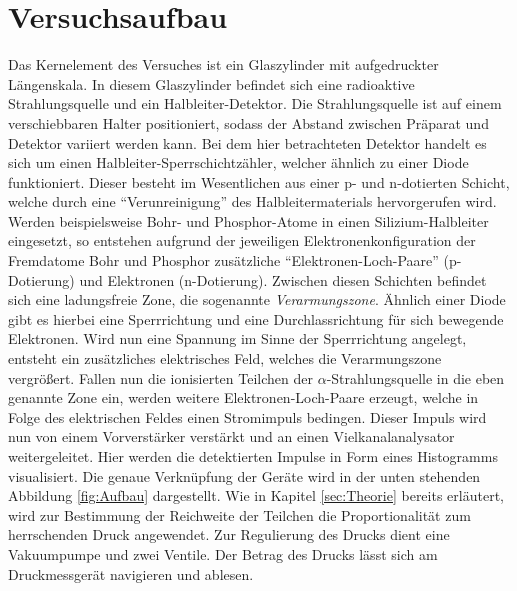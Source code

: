 


\section{Versuchsaufbau}
\label{sec:Versuchsaufbau}

Das Kernelement des Versuches ist ein Glaszylinder mit aufgedruckter Längenskala. In diesem Glaszylinder befindet 
sich eine radioaktive Strahlungsquelle und ein Halbleiter-Detektor. Die Strahlungsquelle ist auf einem verschiebbaren Halter 
positioniert, sodass der Abstand zwischen Präparat und Detektor variiert werden kann. Bei dem hier betrachteten Detektor 
handelt es sich um einen Halbleiter-Sperrschichtzähler, welcher ähnlich zu einer Diode funktioniert. Dieser besteht im 
Wesentlichen aus einer p- und n-dotierten Schicht, welche durch eine \enquote{Verunreinigung} des Halbleitermaterials 
hervorgerufen wird. Werden beispielsweise Bohr- und Phosphor-Atome in einen Silizium-Halbleiter eingesetzt, so entstehen aufgrund 
der jeweiligen Elektronenkonfiguration der Fremdatome Bohr und Phosphor zusätzliche \enquote{Elektronen-Loch-Paare} (p-Dotierung)
und Elektronen (n-Dotierung). Zwischen diesen Schichten befindet sich eine ladungsfreie Zone, die sogenannte 
\emph{Verarmungszone}. Ähnlich einer Diode gibt es hierbei eine Sperrrichtung und eine Durchlassrichtung für sich bewegende Elektronen.
Wird nun eine Spannung im Sinne der Sperrrichtung angelegt, entsteht ein zusätzliches elektrisches Feld, welches die Verarmungszone 
vergrößert. Fallen nun die ionisierten Teilchen der $\alpha$-Strahlungsquelle in die eben genannte Zone ein, werden weitere
Elektronen-Loch-Paare erzeugt, welche in Folge des elektrischen Feldes einen Stromimpuls bedingen. Dieser Impuls wird nun von 
einem Vorverstärker verstärkt und an einen Vielkanalanalysator weitergeleitet. Hier werden die detektierten Impulse in Form eines Histogramms visualisiert. 
Die genaue Verknüpfung der Geräte wird in der unten stehenden Abbildung \ref{fig:Aufbau} dargestellt. Wie in Kapitel \ref{sec:Theorie} bereits erläutert,
wird zur Bestimmung der Reichweite der Teilchen die Proportionalität zum herrschenden Druck angewendet. Zur Regulierung des Drucks dient eine Vakuumpumpe 
und zwei Ventile. Der Betrag des Drucks lässt sich am Druckmessgerät navigieren und ablesen.


